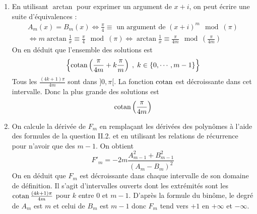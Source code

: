 \begin{enumerate}
\item En utilisant $\arctan$ pour exprimer un argument de $x+i$, on peut écrire une suite d'équivalences :
\begin{multline*}
 A_m(x)=B_m(x)\Leftrightarrow \frac{\pi}{4}\equiv  \text{ un argument de } (x+i)^m \mod(\pi)\\
\Leftrightarrow m\arctan\frac{1}{x} \equiv \frac{\pi}{4}  \mod(\pi) 
\Leftrightarrow \arctan\frac{1}{x} \equiv \frac{\pi}{4m} \mod(\frac{\pi}{4m})
\end{multline*}
On en déduit que l'ensemble des solutions est
\begin{displaymath}
 \left\lbrace 
\operatorname{cotan} \left(\frac{\pi}{4m}+k\frac{\pi}{m} \right)\;,\;k\in\{0,\cdots,m-1\} 
\right\rbrace 
\end{displaymath}
Tous les $\frac{(4k+1)\pi}{4m}$ sont dans $]0,\pi[$. La fonction $\operatorname{cotan}$ est décroissante dans cet intervalle. Donc la plus grande des solutions est
\begin{displaymath}
 \operatorname{cotan}\left( \frac{\pi}{4m}\right) 
\end{displaymath}

\item On calcule la dérivée de $F_m$ en remplaçant les dérivées des polynômes à l'aide des formules de la question II.2. et en utilisant les relations de récurrence pour n'avoir que des $m-1$. On obtient
\begin{displaymath}
 F'_m =
-2m \frac{A_{m-1}^2 + B_{m-1}^2}{(A_m - B_m)^2}
\end{displaymath}
On en déduit que $F_m$ est décroissante dans chaque intervalle de son domaine de définition. Il s'agit d'intervalles ouverts dont les extrémités sont les $\operatorname{cotan} \frac{(4k+1)\pi}{4m} $ pour $k$ entre $0$ et $m-1$.\newline
D'après la formule du binôme, le degré de $A_m$ est $m$ et celui de $B_m$ est $m-1$ donc $F_m$ tend vers $+1$ en $+\infty$ et $-\infty$.
\end{enumerate} 

